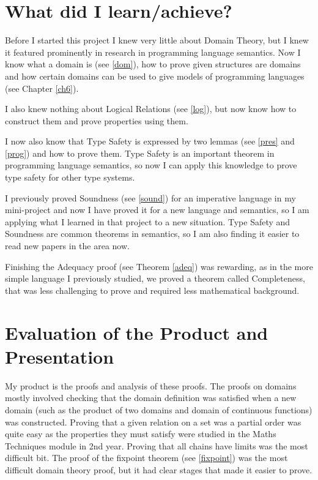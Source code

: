 \section{What did I learn/achieve?}
Before I started this project I knew very little about Domain Theory, but I knew it featured prominently in research in programming language semantics. Now I know what a domain is (see \ref{dom}), how to prove given structures are domains and how certain domains can be used to give models of programming languages (see Chapter \ref{ch6}).

I also knew nothing about Logical Relations (see \ref{log}), but now know how to construct them and prove properties using them.

I now also know that Type Safety is expressed by two lemmas (see \ref{pres} and \ref{prog}) and how to prove them. Type Safety is an important theorem in programming language semantics, so now I can apply this knowledge to prove type safety for other type systems.

I previously proved Soundness (see \ref{sound}) for an imperative language in my mini-project and now I have proved it for a new language and semantics, so I am applying what I learned in that project to a new situation. Type Safety and Soundness are common theorems in semantics, so I am also finding it easier to read new papers in the area now.

Finishing the Adequacy proof (see Theorem \ref{adeq}) was rewarding, as in the more simple language I previously studied, we proved a theorem called Completeness, that was less challenging to prove and required less mathematical background.
 
\section{Evaluation of the Product and Presentation}
My product is the proofs and analysis of these proofs. The proofs on domains mostly involved checking that the domain definition was satisfied when a new domain (such as the product of two domains and domain of continuous functions)  was constructed. Proving that a given relation on a set was a partial order was quite easy as the properties they must satisfy were studied in the Maths Techniques module in 2nd year. Proving that all chains have limits was the most difficult bit. The proof of the fixpoint theorem (see \ref{fixpoint}) was the most difficult domain theory proof, but it had clear stages that made it easier to prove.

